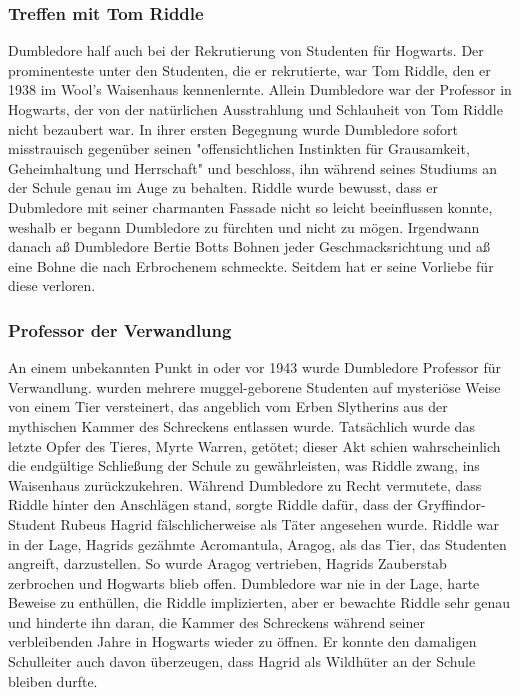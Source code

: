 \documentclass[a4paper, 10pt]{article}
\begin{document}
\subsubsection*{Treffen mit Tom Riddle}
Dumbledore half auch bei der Rekrutierung von Studenten für Hogwarts. Der prominenteste unter den Studenten, die er rekrutierte, war Tom Riddle, den er 1938 im Wool's Waisenhaus kennenlernte. Allein Dumbledore war der Professor in Hogwarts, der von der natürlichen Ausstrahlung und Schlauheit von Tom Riddle nicht bezaubert war. In ihrer ersten Begegnung wurde Dumbledore sofort misstrauisch gegenüber seinen "offensichtlichen Instinkten für Grausamkeit, Geheimhaltung und Herrschaft" und beschloss, ihn während seines Studiums an der Schule genau im Auge zu behalten. Riddle wurde bewusst, dass er Dubmledore mit seiner charmanten Fassade nicht so leicht beeinflussen konnte, weshalb er begann Dumbledore zu fürchten und nicht zu mögen.
\vspace{10pt}
\newline
Irgendwann danach aß Dumbledore Bertie Botts Bohnen jeder Geschmacksrichtung und aß eine Bohne die nach Erbrochenem schmeckte. Seitdem hat er seine Vorliebe für diese verloren.
\subsubsection*{Professor der Verwandlung}
An einem unbekannten Punkt in oder vor 1943 wurde Dumbledore Professor für Verwandlung.
\vspace{10pt}
 wurden mehrere muggel-geborene Studenten auf mysteriöse Weise von einem Tier versteinert, das angeblich vom Erben
Slytherins aus der mythischen Kammer des Schreckens entlassen wurde. Tatsächlich wurde das letzte Opfer des Tieres, Myrte Warren, getötet; dieser Akt schien wahrscheinlich die endgültige Schließung der Schule zu gewährleisten, was Riddle zwang, ins Waisenhaus zurückzukehren. Während Dumbledore zu Recht vermutete, dass Riddle hinter den Anschlägen stand, sorgte Riddle dafür, dass der Gryffindor-Student Rubeus Hagrid fälschlicherweise als Täter angesehen wurde.
\vspace{10pt}
\newline
Riddle war in der Lage, Hagrids gezähmte Acromantula, Aragog, als das Tier, das Studenten angreift, darzustellen. So wurde Aragog vertrieben, Hagrids Zauberstab zerbrochen und Hogwarts blieb offen. Dumbledore war nie in der Lage, harte Beweise zu enthüllen, die Riddle implizierten, aber er bewachte Riddle sehr genau und hinderte ihn daran, die Kammer des Schreckens während seiner verbleibenden Jahre in Hogwarts wieder zu öffnen. Er konnte den damaligen Schulleiter auch davon überzeugen, dass Hagrid als Wildhüter an der Schule bleiben durfte.
\end{document}
